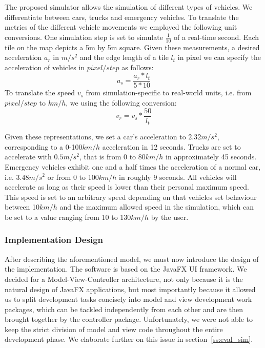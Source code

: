 The proposed simulator allows the simulation of different types of vehicles. We differentiate between cars, trucks and emergency vehicles. To translate the metrics of the different vehicle movements we employed the following unit conversions. One simulation step is set to simulate $\frac{1}{10}$ of a real-time second. Each tile on the map depicts a 5m by 5m square. Given these measurements, a desired acceleration $a_r$ in $m/s^2$ and the edge length of a tile $l_t$ in pixel we can specify the acceleration of vehicles in $pixel/step$ as follows:
	\begin{equation}\label{for:acceleration}	
		a_s = \frac{a_r * l_t}{5 * 10}
	\end{equation}
	To translate the speed $v_s$ from simulation-specific to real-world units, i.e. from $pixel/step$ to $km/h$, we using the following conversion:
	\begin{equation}\label{for:speed}
		v_r = v_s * \frac{50}{l_t} 
	\end{equation}
	
Given these representations, we set a car's acceleration to $2.32m/s^2$, corresponding to a 0-100$km/h$ acceleration in 12 seconds. Trucks are set to accelerate with $0.5m/s^2$, that is from 0 to 80$km/h$ in approximately 45 seconds. Emergency vehicles exhibit 	one and a half times the acceleration of a normal car, i.e. $3.48m/s^2$ or from 0 to 100$km/h$ in roughly 9 seconds. All vehicles will accelerate as long as their speed is lower than their personal maximum speed. This speed is set to an arbitrary speed depending on that vehicles set behaviour between 10$km/h$ and the maximum allowed speed in the simulation, which can be set to a value ranging from 10 to 130$km/h$ by the user.

\subsubsection*{Implementation Design}
	
After describing the aforementioned model, we must now introduce the design of the implementation. The software is based on the JavaFX UI framework. We decided for a Model-View-Controller architecture, not only because it is the natural design of JavaFX applications, but most importantly because it allowed us to split development tasks concisely into model and view development work packages, which can be tackled independently from each other and are then brought together by the controller package. Unfortunately, we were not able to keep the strict division of model and view code throughout the entire development phase. We elaborate further on this issue in section~\ref{ss:eval_sim}. 

